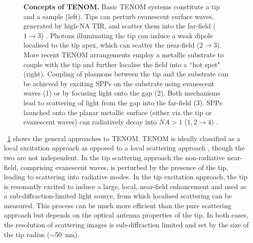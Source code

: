 \documentclass{article}
\begin{document}
\begin{figure}[bt]
\caption[Concepts of TENOM]{\textbf{Concepts of TENOM.} Basic TENOM systems constitute a tip and a sample (left). Tips can perturb evanescent surface waves, generated by high-NA TIR, and scatter them into the far-field ($1\rightarrow3$) \cite{neacsu2005, mehtani2006}. Photons illuminating the tip can induce a weak dipole localised to the tip apex, which can scatter the near-field ($2\rightarrow3$). More recent TENOM arrangements employ a metallic substrate to couple with the tip and further localise the field into a ``hot spot" (right). Coupling of plasmons between the tip and the substrate can be achieved by exciting SPPs on the substrate using evanescent waves (1) or by focusing light onto the gap (2). Both mechanisms lead to scattering of light from the gap into the far-field (3). SPPs launched onto the planar metallic surface (either via the tip or evanescent waves) can radiatively decay into $\mathit{NA}>1$ ($1,2\rightarrow4$) \cite{wang2011}.}
\label{fig:tenom_concept}
\end{figure}

\figurename~\ref{fig:tenom_concept} shows the general approaches to TENOM. TENOM is ideally classified as a local excitation approach as opposed to a local scattering approach \cite{novotny2006}, though the two are not independent. In the tip scattering approach the non-radiative near-field, comprising evanescent waves, is perturbed by the presence of the tip, leading to scattering into radiative modes. In the tip excitation approach, the tip is resonantly excited to induce a large, local, near-field enhancement and used as a sub-diffraction-limited light source, from which  localised scattering can be measured. This process can be much more efficient than the pure scattering approach but depends on the optical antenna properties of the tip. In both cases, the resolution of scattering images is sub-diffraction limited and set by the size of the tip radius ($\sim$\SI{50}{nm}).

\end{document}
